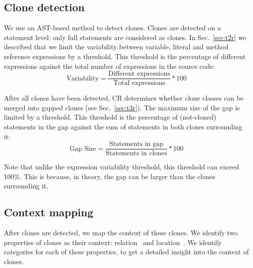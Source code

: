 \documentclass[sigconf,review,anonymous]{acmart}
\begin{document}
\subsection{Clone detection}\label{sec:detection}
We use an AST-based method to detect clones. Clones are detected on a statement level: only full statements are considered as clones. In Sec.~\ref{sec:t2r} we described that we limit the variability between variable, literal and method reference expressions by a threshold. This threshold is the percentage of different expressions against the total number of expressions in the source code:
\begin{equation}\label{eq:type2r}
\text{Variability}=\frac{\text{Different expressions}}{\text{Total expressions}}*100
\end{equation}

After all clones have been detected, CR determines whether clone classes can be merged into gapped clones (see Sec.~\ref{sec:t3r}). The maximum size of the gap is limited by a threshold. This threshold is the percentage of (not-cloned) statements in the gap against the sum of statements in both clones surrounding it:
\begin{equation}\label{eq:type3r}
\text{Gap Size}=\frac{\text{Statements in gap}}{\text{Statements in clones}}*100
\end{equation}

Note that unlike the expression variability threshold, this threshold can exceed 100\%. This is because, in theory, the gap can be larger than the clones surrounding it.

\subsection{Context mapping} \label{sec:context}
After clones are detected, we map the context of these clones. We identify two properties of clones as their context: relation~\cite{fontana2012duplicated} and location~\cite{tairas2011representing}. We identify categories for each of these properties, to get a detailed insight into the context of clones.
\end{document}
